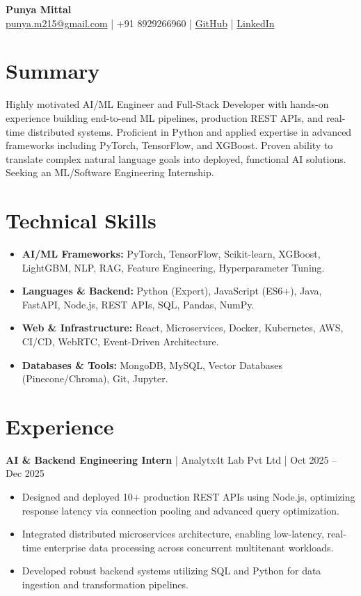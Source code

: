 \documentclass[10pt, a4paper]{article}
\makeatletter
\newcommand{\contactinfo}[1]{
    \centering
    \vspace{2pt}
    \textbf{\Huge #1} \\
    \vspace{2pt}
    \small \href{mailto:punya.m215@gmail.com}{punya.m215@gmail.com} | +91 8929266960 | 
    \href{https://github.com/PunyaMittal}{GitHub} | \href{https://linkedin.com/in/punyamittal}{LinkedIn}
    \vspace{4pt}
}
\makeatother
\begin{document}
\contactinfo{Punya Mittal}

\section*{Summary}
Highly motivated AI/ML Engineer and Full-Stack Developer with hands-on experience building end-to-end ML pipelines, production REST APIs, and real-time distributed systems. Proficient in Python and applied expertise in advanced frameworks including PyTorch, TensorFlow, and XGBoost. Proven ability to translate complex natural language goals into deployed, functional AI solutions. Seeking an ML/Software Engineering Internship.

\section*{Technical Skills}
\begin{itemize}[leftmargin=*, itemsep=2pt, parsep=0pt]
    \item \textbf{AI/ML Frameworks:} PyTorch, TensorFlow, Scikit-learn, XGBoost, LightGBM, NLP, RAG, Feature Engineering, Hyperparameter Tuning.
    \item \textbf{Languages \& Backend:} Python (Expert), JavaScript (ES6+), Java, FastAPI, Node.js, REST APIs, SQL, Pandas, NumPy.
    \item \textbf{Web \& Infrastructure:} React, Microservices, Docker, Kubernetes, AWS, CI/CD, WebRTC, Event-Driven Architecture.
    \item \textbf{Databases \& Tools:} MongoDB, MySQL, Vector Databases (Pinecone/Chroma), Git, Jupyter.
\end{itemize}

\section*{Experience}
\textbf{AI & Backend Engineering Intern} | Analytx4t Lab Pvt Ltd | Oct 2025 – Dec 2025
\begin{itemize}[leftmargin=*, itemsep=1pt]
    \item Designed and deployed 10+ production REST APIs using Node.js, optimizing response latency via connection pooling and advanced query optimization.
    \item Integrated distributed microservices architecture, enabling low-latency, real-time enterprise data processing across concurrent multitenant workloads.
    \item Developed robust backend systems utilizing SQL and Python for data ingestion and transformation pipelines.
\end{itemize}
\end{document}
